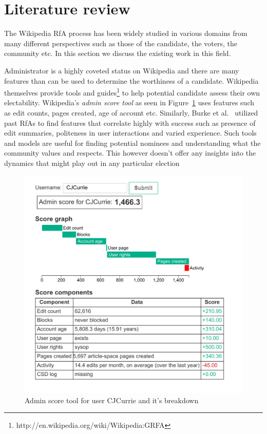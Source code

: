 \section{Literature review}
\label{sec:literature-review}

The Wikipedia RfA process has been widely studied in various domains from many different perspectives such as those of the candidate, the voters, the community etc. In this section we discuss the existing work in this field.

Administrator is a highly coveted status on Wikipedia and there are many features than can be used to determine the worthiness of a candidate. Wikipedia themselves provide tools and guides\footnote{http://en.wikipedia.org/wiki/Wikipedia:GRFA} to help potential candidate assess their own electability. Wikipedia's \textit{admin score tool} as seen in Figure~\ref{fig:admin-score} uses features such as edit counts, pages created, age of account etc. Similarly, Burke et al.\ \cite{BurkeMoppingUp} utilized past RfAs to find features that correlate highly with success such as presence of edit summaries, politeness in user interactions and varied experience. Such tools and models are useful for finding potential nominees and understanding what the community values and respects. This however doesn't offer any insights into the dynamics that might play out in any particular election
\begin{figure}[h!]
    \centering
    \includegraphics[width=\linewidth]{images/Asynchronous Admin Score.pdf}
    \caption{Admin score tool for user CJCurrie and it's breakdown}
    \label{fig:admin-score}
\end{figure}

